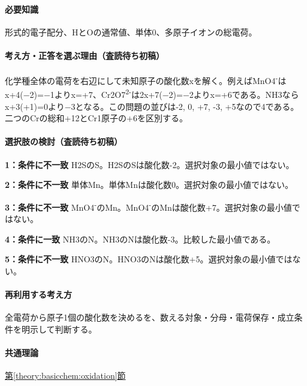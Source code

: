 \paragraph{必要知識} 形式的電子配分、HとOの通常値、単体0、多原子イオンの総電荷。

\paragraph{考え方・正答を選ぶ理由（査読待ち初稿）} 化学種全体の電荷を右辺にして未知原子の酸化数xを解く。例えばMnO4\textsuperscript{-}はx+4(−2)=−1よりx=+7、Cr2O7\textsuperscript{2-}は2x+7(−2)=−2よりx=+6である。NH3ならx+3(+1)=\allowbreak{}0より−3となる。この問題の並びは-2, 0, +7, -3, +5なので4である。二つのCrの総和+12とCr1原子の+6を区別する。

\paragraph{選択肢の検討（査読待ち初稿）}\mbox{}\par

\noindent\textbf{1：条件に不一致} H2SのS。H2SのSは酸化数-2。選択対象の最小値ではない。\par

\noindent\textbf{2：条件に不一致} 単体Mn。単体Mnは酸化数0。選択対象の最小値ではない。\par

\noindent\textbf{3：条件に不一致} MnO4\textsuperscript{-}のMn。MnO4\textsuperscript{-}のMnは酸化数+7。選択対象の最小値ではない。\par

\noindent\textbf{4：条件に一致} NH3のN。NH3のNは酸化数-3。比較した最小値である。\par

\noindent\textbf{5：条件に不一致} HNO3のN。HNO3のNは酸化数+5。選択対象の最小値ではない。\par

\paragraph{再利用する考え方} 全電荷から原子1個の酸化数を決めるを、数える対象・分母・電荷保存・成立条件を明示して判断する。

\paragraph{共通理論} \hyperref[theory:basicchem:oxidation]{第\ref*{theory:basicchem:oxidation}節}

